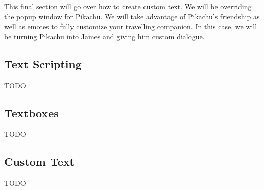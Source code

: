 \documentclass[../main.tex]{subfiles}
\begin{document}
    This final section will go over how to create custom text.  We will be overriding the popup window for Pikachu.  We will take advantage of Pikachu's friendship as well as emotes to fully customize your travelling companion.  In this case, we will be turning Pikachu into James and giving him custom dialogue.

    \subsection{Text Scripting}
    TODO

    \subsection{Textboxes}
    TODO

    \subsection{Custom Text}
    TODO
\end{document}
